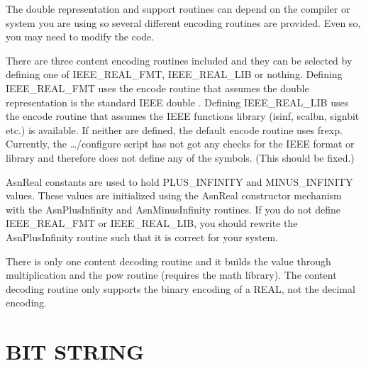 The {\C double} representation and support routines can depend on
the compiler or system you are using so several different encoding
routines are provided.  Even so, you may need to modify the code.

There are three content encoding routines included and they can be selected by defining one of {\C IEEE\_REAL\_FMT}, {\C IEEE\_REAL\_LIB} or nothing.
Defining {\C IEEE\_REAL\_FMT} uses the encode routine that assumes the double representation is the standard IEEE double \cite{68881}.
Defining {\C IEEE\_REAL\_LIB} uses the encode routine that assumes the IEEE functions library (isinf, scalbn, signbit etc.) is available.
If neither are defined, the default encode routine uses {\C frexp}.
Currently, the {\ufn \dots/configure} script has not got any checks for the IEEE format or library and therefore does not define any of the symbols. (This should be fixed.)

{\C AsnReal} constants are used to hold {\C PLUS\_INFINITY} and
{\C MINUS\_INFINITY} values.  These values are initialized using the
{\C AsnReal} constructor mechanism with the {\C AsnPlusInfinity}
and {\C AsnMinusInfinity} routines.  If you do not define
{\C IEEE\_REAL\_FMT} or {\C IEEE\_REAL\_LIB}, you should rewrite the
{\C AsnPlusInfinity} routine such that it is correct for your system.

There is only one content decoding routine and it builds the value
through multiplication and the {\C pow} routine (requires the math
library). The content decoding routine only supports the binary
encoding of a REAL, not the decimal encoding.

\section{\label{bits-C++-section}BIT STRING}

